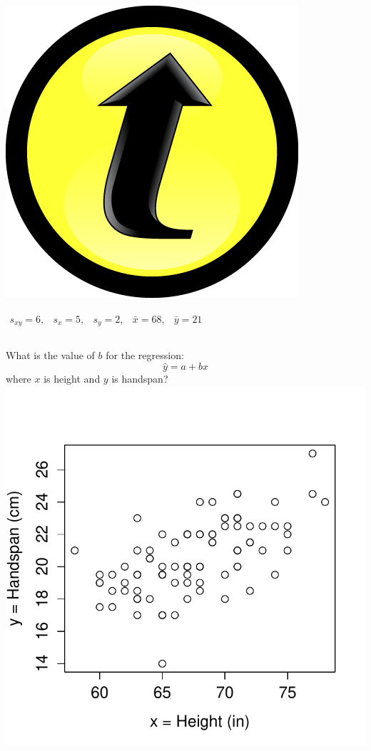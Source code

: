 \documentclass[handout]{beamer}
\begin{document}
\begin{frame}
\frametitle{\includegraphics[scale = 0.05]{./images/clicker}}
$\begin{array}{ccccc} s_{xy} = 6,&s_x = 5,& s_y = 2,& \bar{x} = 68,& \bar{y} = 21\end{array}$
\begin{columns}[c]
\column{2.5in}
What is the value of $b$ for the regression: $$\hat{y}=a+bx$$
where $x$ is height and $y$ is handspan?
\column{1.8in}
\includegraphics[scale = 0.4]{./images/height_handspan1}
\end{columns}
\alert{$$\phantom{b = \frac{s_{xy}}{s_x^2} = \frac{6}{(4.5)^2} = 6/20.25 \approx 0.3}$$}
\end{frame}
\end{document}
